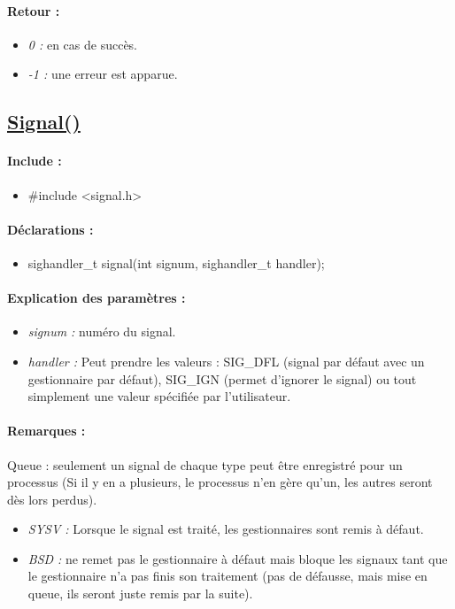 \documentclass{article}[12pt]
\begin{document}
\paragraph{Retour : }
\begin{itemize}
	\item \emph{0 : } en cas de succès.
	\item \emph{-1 : } une erreur est apparue.
\end{itemize}
\subsection{\href{http://jp.barralis.com/linux-man/man2/signal.2.php}{Signal()}}
\paragraph{Include : }
\begin{itemize}
	\item \#include <signal.h>
\end{itemize}
\paragraph{Déclarations : }
\begin{itemize}
	\item sighandler\_t signal(int signum, sighandler\_t handler);
\end{itemize}
\paragraph{Explication des paramètres : }
\begin{itemize}
	\item \emph{signum : } numéro du signal.
	\item \emph{handler : } Peut prendre les valeurs : SIG\_DFL (signal par défaut avec un gestionnaire par défaut), SIG\_IGN (permet d'ignorer le signal) ou tout simplement une valeur spécifiée par l'utilisateur.
\end{itemize}
\paragraph{Remarques : }
Queue : seulement un signal de chaque type peut être enregistré pour un processus (Si il y en a plusieurs, le processus n'en gère qu'un, les autres seront dès lors perdus). 
\begin{itemize}
	\item \emph{SYSV : } Lorsque le signal est traité, les gestionnaires sont remis à défaut.
    \item  \emph{BSD : } ne remet pas le gestionnaire à défaut mais bloque les signaux tant que le gestionnaire n'a pas finis son traitement (pas de défausse, mais mise en queue, ils seront juste remis par la suite). 
\end{itemize}
\end{document}
